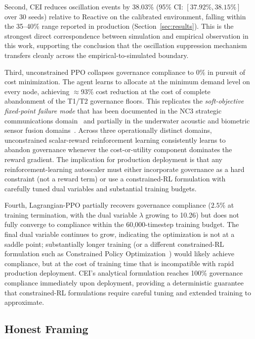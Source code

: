 \documentclass[runningheads]{llncs}
\begin{document}
Second, CEI reduces oscillation events by 38.03\% (95\% CI: $[37.92\%, 38.15\%]$ over 30 seeds) relative to Reactive on the calibrated environment, falling within the 35--40\% range reported in production (Section~\ref{sec:results}). This is the strongest direct correspondence between simulation and empirical observation in this work, supporting the conclusion that the oscillation suppression mechanism transfers cleanly across the empirical-to-simulated boundary.

Third, unconstrained PPO collapses governance compliance to 0\% in pursuit of cost minimization. The agent learns to allocate at the minimum demand level on every node, achieving $\approx$93\% cost reduction at the cost of complete abandonment of the T1/T2 governance floors. This replicates the \emph{soft-objective fixed-point failure mode} that has been documented in the NC3 strategic communications domain~\cite{paper1} and partially in the underwater acoustic and biometric sensor fusion domains~\cite{paper2}. Across three operationally distinct domains, unconstrained scalar-reward reinforcement learning consistently learns to abandon governance whenever the cost-or-utility component dominates the reward gradient. The implication for production deployment is that any reinforcement-learning autoscaler must either incorporate governance as a hard constraint (not a reward term) or use a constrained-RL formulation with carefully tuned dual variables and substantial training budgets.

Fourth, Lagrangian-PPO partially recovers governance compliance ($2.5\%$ at training termination, with the dual variable $\lambda$ growing to 10.26) but does not fully converge to compliance within the 60{,}000-timestep training budget. The final dual variable continues to grow, indicating the optimization is not at a saddle point; substantially longer training (or a different constrained-RL formulation such as Constrained Policy Optimization~\cite{achiam}) would likely achieve compliance, but at the cost of training time that is incompatible with rapid production deployment. CEI's analytical formulation reaches 100\% governance compliance immediately upon deployment, providing a deterministic guarantee that constrained-RL formulations require careful tuning and extended training to approximate.

\subsection{Honest Framing}
\end{document}
